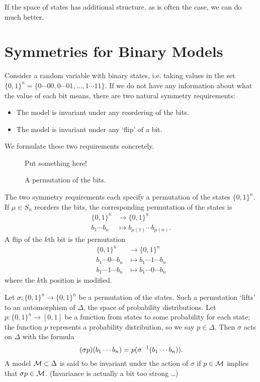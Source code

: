 \documentclass[cclicense]{hmcthesis}
\numberwithin{equation}{chapter}
\numberwithin{thmcounter}{chapter}
\begin{document}
    If the space of states has additional structure, as is often the case, we
    can do much better.


\section{Symmetries for Binary Models}

    Consider a random variable with binary states, i.e. taking values in the set
    $\{0, 1\}^n = \{0\cdots00, 0\cdots01, \ldots, 1\cdots11\}$.  If we do
    not have any information about what the value of each bit means, there are
    two natural symmetry requirements:
    \begin{itemize}\nospace
    \item The model is invariant under any reordering of the bits.
    \item The model is invariant under any `flip' of a bit.
    \end{itemize}
    We formulate these two requirements concretely.  

    \begin{figure}[H]
        \centering
        Put something here!
        \caption{A permutation of the bits.}
    \end{figure}
    
    The two symmetry requirements each specify a permutation of the states $\{0,
    1\}^n$.  If $\mu \in S_n$ reorders the bits, the corresponding permutation
    of the states is
    \begin{align*}
        \{0, 1\}^n &\to \{0, 1\}^n \\
        b_1 \cdots b_n &\mapsto b_{\mu(1)} \cdots b_{\mu(n)}.
    \end{align*}
    A flip of the $k$th bit is the permutation
    \begin{align*}
        \{0, 1\}^n &\to \{0, 1\}^n \\
        b_1 \cdots 0 \cdots b_n 
        &\mapsto
        b_1 \cdots 1 \cdots b_n  \\
        b_1 \cdots 1 \cdots b_n 
        &\mapsto
        b_1 \cdots 0 \cdots b_n
    \end{align*}
    where the $k$th position is modified.  
    
    Let $\sigma: \{0, 1\}^n \to \{0, 1\}^n$ be a permutation of the states.
    Such a permutation `lifts' to an automorphism of $\Delta$, the space of
    probability distributions.  Let $p: \{0, 1\}^n \to [0, 1]$ be a function
    from states to some probability for each state; the function $p$ represents
    a probability distribution, so we say $p \in \Delta$.  Then $\sigma$ acts on
    $\Delta$ with the formula
    \begin{equation}
        (\sigma p)(b_1 \cdots b_n) = p(\sigma^{-1}(b_1 \cdots b_n)).
        \label{eq:sigma-p}
    \end{equation}
    A model $\mathcal{M} \subset \Delta$ is said to be invariant under the action of
    $\sigma$ if $p \in \mathcal{M}$ implies that $\sigma p \in \mathcal{M}$.  (Invariance is
    actually a bit too strong \ldots)
\end{document}
